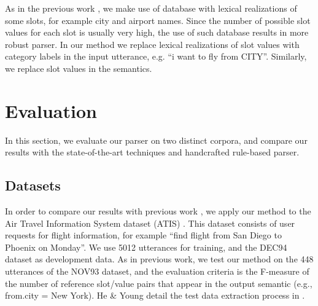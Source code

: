 \documentclass{article}
\begin{document}
As in the previous work \cite{zettlemoyer07,mairesse09,meza08b}, we make use of database with lexical realizations of some slots, for example city and airport names. Since the number of possible slot values for each slot is usually very high, the use of such database results in more robust parser. In our method we replace lexical realizations of slot values with category labels in the input utterance, e.g. ``i want to fly from CITY''. Similarly, we replace slot values in the semantics.



\section{Evaluation} \label{sec:evaluation}

In this section, we evaluate our parser on two distinct corpora, and compare our results with the state-of-the-art techniques and handcrafted rule-based parser. 

\subsection{Datasets}

In order to compare our results with previous work \cite{mairesse09, he05,zettlemoyer07,meza08b},
we apply our method to the Air Travel Information System dataset
(ATIS) \cite{atis94}. This dataset consists of user requests for flight information, for example ``find flight from San Diego to Phoenix on Monday''. We use 5012 utterances for training, and the DEC94 dataset as development data. As in previous work, we test our method on the 448 utterances of the NOV93 dataset, and the evaluation criteria is the F-measure of the number of reference slot/value pairs that appear in the output semantic (e.g., from.city = New York). He \& Young detail the test data extraction process in \cite{he05}.
\end{document}
